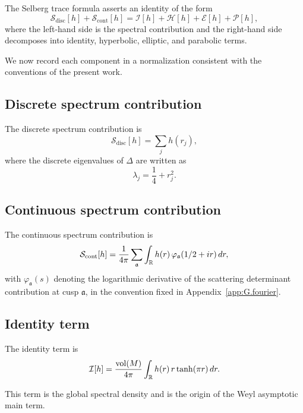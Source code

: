 The Selberg trace formula asserts an identity of the form
\begin{equation}\label{eq:H.selberg.master}
\mathcal{S}_{\mathrm{disc}}[h]
+
\mathcal{S}_{\mathrm{cont}}[h]
=
\mathcal{I}[h]
+
\mathcal{H}[h]
+
\mathcal{E}[h]
+
\mathcal{P}[h],
\end{equation}
where the left-hand side is the spectral contribution and the right-hand side decomposes into identity, hyperbolic,
elliptic, and parabolic terms.

We now record each component in a normalization consistent with the conventions of the present work.

\subsection{Discrete spectrum contribution}
\label{subsec:H.disc}

The discrete spectrum contribution is
\begin{equation}\label{eq:H.disc}
\mathcal{S}_{\mathrm{disc}}[h]
=
\sum_{j} h(r_j),
\end{equation}
where the discrete eigenvalues of $\Delta$ are written as
\[
\lambda_j=\frac14+r_j^2.
\]

\subsection{Continuous spectrum contribution}
\label{subsec:H.cont}

The continuous spectrum contribution is
\begin{equation}\label{eq:H.cont}
\mathcal{S}_{\mathrm{cont}}[h]
=
\frac{1}{4\pi}\sum_{\mathfrak{a}}
\int_{\mathbb{R}} h(r)\,\varphi_{\mathfrak{a}}(1/2+ir)\,dr,
\end{equation}
with $\varphi_{\mathfrak{a}}(s)$ denoting the logarithmic derivative of the scattering determinant contribution at
cusp $\mathfrak{a}$, in the convention fixed in Appendix~\ref{app:G.fourier}.

\subsection{Identity term}
\label{subsec:H.identity}

The identity term is
\begin{equation}\label{eq:H.identity}
\mathcal{I}[h]
=
\frac{\mathop{\mathrm{vol}}\nolimits(M)}{4\pi}
\int_{\mathbb{R}} h(r)\,r\tanh(\pi r)\,dr.
\end{equation}

This term is the global spectral density and is the origin of the Weyl asymptotic main term.

